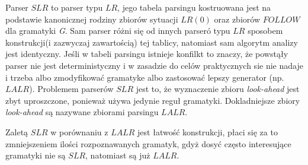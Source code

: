 {Parser $SLR$ to parser typu $LR$, jego tabela parsingu kostruowana jest na podstawie kanonicznej rodziny zbiorów sytuacji $LR(0)$ oraz zbiorów $FOLLOW$ dla gramatyki \textit{G}. Sam parser różni się od innych parseró typu $LR$ sposobem konstrukcji(i zazwyczaj zawartością) tej tablicy, natomiast sam algorytm analizy jest identyczny. Jeśli w tabeli parsingu istnieje konfilkt to znaczy, że powstąły parser nie jest deterministyczny i w zasadzie do celów praktycznych sie nie nadaje i trzeba albo zmodyfikować gramatyke albo zastosować lepszy generator (np. $LALR$).  Problemem parserów $SLR$ jest to, że wyznaczenie zbioru \textit{look-ahead} jest zbyt uproszczone, ponieważ używa jedynie reguł gramatyki. Dokladniejsze zbiory \textit{look-ahead} są nazywane zbiorami parsingu $LALR$.

Zaletą $SLR$ w porównaniu z $LALR$ jest łatwość konstrukcji, płaci się za to zmniejszeniem ilości rozpoznawanych gramatyk, gdyż dosyć często interesujące gramatyki nie są $SLR$, natomiast są już $LALR$.
}
{}

